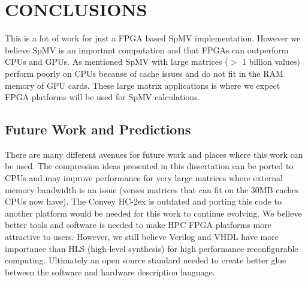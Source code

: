 \chapter{CONCLUSIONS}
\label{chp:conclusion}
This is a lot of work for just a FPGA based SpMV implementation. However we believe SpMV is an important computation and that FPGAs can outperform CPUs and GPUs. As mentioned SpMV with large matrices ($>$ 1 billion values) perform poorly on CPUs because of cache issues and do not fit in the RAM memory of GPU cards. These large matrix applications is where we expect FPGA platforms will be used for SpMV calculations.
\section{Future Work and Predictions}
There are many different avenues for future work and places where this work can be used. The compression ideas presented in this dissertation can be ported to CPUs and may improve performance for very large matrices where external memory bandwidth is an issue (verses matrices that can fit on the 30MB caches CPUs now have). The Convey HC-2ex is outdated and porting this code to another platform would be needed for this work to continue evolving. We believe better tools and software is needed to make HPC FPGA platforms more attractive to users. However, we still believe Verilog and VHDL have more importance than HLS (high-level synthesis) for high performance reconfigurable computing. Ultimately an open source standard needed to create better glue between the software and hardware description language.

